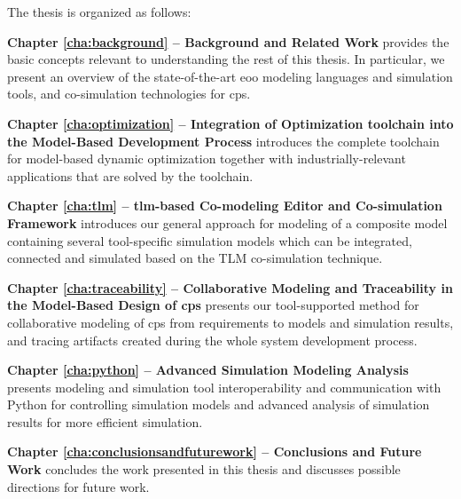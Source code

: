 The thesis is organized as follows:

\begin{description}
	
\item \textbf{Chapter \ref{cha:background} – Background and Related Work } provides the basic concepts relevant to understanding the rest of this thesis. In particular, we present an overview of the state-of-the-art \acrshort{eoo} modeling languages and simulation tools, and co-simulation technologies for \acrshort{cps}. 

\item \textbf{Chapter \ref{cha:optimization} – Integration of Optimization toolchain into the Model-Based Development Process} introduces the complete toolchain for model-based dynamic optimization together with industrially-relevant applications that are solved by the toolchain.

\item \textbf{Chapter \ref{cha:tlm} – \acrshort{tlm}-based Co-modeling Editor and Co-simulation Framework} introduces our general approach for modeling of a composite model containing several tool-specific simulation models which can be integrated, connected and simulated based on the TLM co-simulation technique.

\item \textbf{Chapter \ref{cha:traceability} – Collaborative Modeling and Traceability in the Model-Based Design of \acrshort{cps}} presents our tool-supported method for collaborative modeling of \acrshort{cps} from requirements to models and simulation results, and tracing artifacts created during the whole system development process. 

\item \textbf{Chapter \ref{cha:python} – Advanced Simulation Modeling Analysis} presents modeling and simulation tool interoperability and communication with Python for controlling simulation models and advanced analysis of simulation results for more efficient simulation.

\item \textbf{Chapter \ref{cha:conclusionsandfuturework} – Conclusions and Future Work} concludes the work presented in this thesis and discusses possible directions for future work.

\end{description}







